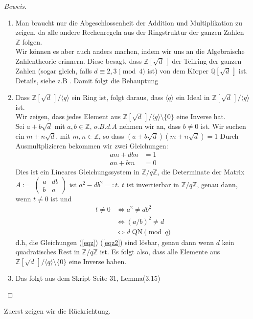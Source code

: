 \documentclass{article}
\newcommand{\Rational}{\ensuremath{\mathbb{Q}}}
\newcommand{\Integer}{\ensuremath{\mathbb{Z}}}
\newcommand{\Qadjd}{\ensuremath{\Rational[\sqrt{d}\,]}}
\newcommand{\Zadjd}{\ensuremath{\Integer[\sqrt{d}\,]}}
\newcommand{\ZAdjdModq}{\ensuremath{\Integer[\sqrt{d}\,]/\langle q \rangle}}
\newcommand{\Zmodq}{\ensuremath{\Integer/q\Integer}}
\newcommand{\ZadjdModqOhnez}{\ensuremath{\ZAdjdModq \setminus\! \{ 0 \}}}
\newcommand{\QNmodq}{\ensuremath{\mbox{QN} \! \pmod{q}}}
\begin{document}
\begin{proof}[Beweis]
	\begin{enumerate}
		\item Man braucht nur die Abgeschlossenheit der Addition und Multiplikation zu zeigen, da alle andere Rechenregeln aus der Ringstruktur der ganzen Zahlen $\Integer$ folgen. \\ Wir k\"{o}nnen es aber auch anders machen, indem wir uns an die Algebraische Zahlentheorie erinnern. Diese besagt, dass $\Zadjd$ der Teilring der ganzen Zahlen (sogar gleich, falls $d \equiv {2,3} \pmod{4}$ ist) von dem K\"{o}rper $\Qadjd$ ist. Details, siehe z.B \cite{zahlentheorie}. Damit folgt
		die Behauptung
		\item 
		Dass $\ZAdjdModq$ ein Ring ist, folgt daraus, dass $\langle q \rangle$ ein Ideal in $\ZAdjdModq$ ist.\\
		Wir zeigen, dass jedes Element aus $\ZadjdModqOhnez$ eine Inverse hat.\\
		Sei $a + b\sqrt{d}$ mit $a,b\in \Integer$, $o.B.d.A$ nehmen wir an, dass $b \neq 0$ ist. Wir suchen ein $m + n\sqrt{d}$, mit $m,n \in \Integer$, so dass $(a + b\sqrt{d})(m + n\sqrt{d}) = 1$ Durch Ausmultplizieren bekommen wir zwei Gleichungen:
		\begin{align}
		am + dbn &= 1 \label{eqz}\\
		an + bm &= 0  \label{eqz2}
		\end{align} 
		Dies ist ein Lineares Gleichungssystem in $\Zmodq$, die Determinate der Matrix $A := $
		$\begin{pmatrix}
		a & db\\
		b & a
		\end{pmatrix}$
		ist $a^2 - db^2 =: t$. $t$ ist invertierbar in $\Zmodq$, genau dann, wenn $t\neq 0$ ist und 
		\begin{align*}
			t \neq 0 &\Leftrightarrow a^2 \neq db^2 \\
				&\Leftrightarrow (a/b)^2 \neq d\\
				&\Leftrightarrow d \; \QNmodq
		\end{align*}
		d.h, die Gleichungen (\ref{eqz}) (\ref{eqz2}) sind l\"{o}sbar, genau dann wenn
		$d$ kein quadratisches Rest in $\Zmodq$ ist. Es folgt also, dass
		alle Elemente aus $\ZadjdModqOhnez$ eine Inverse haben.
		\item
		Das folgt aus dem Skript \cite{script} Seite 31, Lemma(3.15)
	\end{enumerate}
\end{proof}
Zuerst zeigen wir die R\"{u}ckrichtung.
\end{document}
